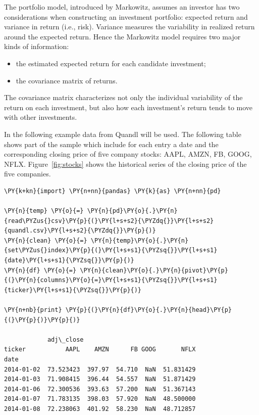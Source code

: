 The portfolio model, introduced by Markowitz, assumes an investor has
two considerations when constructing an investment portfolio: expected
return and variance in return (i.e., risk). Variance measures the
variability in realized return around the expected return. Hence the
Markowitz model requires two major kinds of information:

\begin{itemize}
\tightlist
\item
  the estimated expected return for each candidate investment;
\item
  the covariance matrix of returns.
\end{itemize}

The covariance matrix characterizes not only the individual variability
of the return on each investment, but also how each investment's return
tends to move with other investments.

In the following example data from Quandl will be used. The following
table shows part of the sample which include for each entry a date and
the corresponding closing price of five company stocks: AAPL, AMZN, FB,
GOOG, NFLX. Figure~\ref{fig:stocks} shows the historical series of the closing price
of the five companies.

    \begin{tcolorbox}[breakable, size=fbox, boxrule=1pt, pad at break*=1mm,colback=cellbackground, colframe=cellborder]
\begin{Verbatim}[commandchars=\\\{\}]
\PY{k+kn}{import} \PY{n+nn}{pandas} \PY{k}{as} \PY{n+nn}{pd}

\PY{n}{temp} \PY{o}{=} \PY{n}{pd}\PY{o}{.}\PY{n}{read\PYZus{}csv}\PY{p}{(}\PY{l+s+s2}{\PYZdq{}}\PY{l+s+s2}{quandl.csv}\PY{l+s+s2}{\PYZdq{}}\PY{p}{)}
\PY{n}{clean} \PY{o}{=} \PY{n}{temp}\PY{o}{.}\PY{n}{set\PYZus{}index}\PY{p}{(}\PY{l+s+s1}{\PYZsq{}}\PY{l+s+s1}{date}\PY{l+s+s1}{\PYZsq{}}\PY{p}{)}
\PY{n}{df} \PY{o}{=} \PY{n}{clean}\PY{o}{.}\PY{n}{pivot}\PY{p}{(}\PY{n}{columns}\PY{o}{=}\PY{l+s+s1}{\PYZsq{}}\PY{l+s+s1}{ticker}\PY{l+s+s1}{\PYZsq{}}\PY{p}{)}

\PY{n+nb}{print} \PY{p}{(}\PY{n}{df}\PY{o}{.}\PY{n}{head}\PY{p}{(}\PY{p}{)}\PY{p}{)}

            adj\_close
ticker           AAPL    AMZN      FB GOOG       NFLX
date
2014-01-02  73.523423  397.97  54.710  NaN  51.831429
2014-01-03  71.908415  396.44  54.557  NaN  51.871429
2014-01-06  72.300536  393.63  57.200  NaN  51.367143
2014-01-07  71.783135  398.03  57.920  NaN  48.500000
2014-01-08  72.238063  401.92  58.230  NaN  48.712857
    \end{Verbatim}
\end{tcolorbox}

